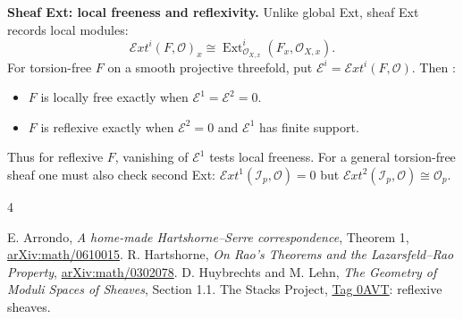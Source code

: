 \documentclass[11pt,a4paper]{article}
\begin{document}
\textbf{Sheaf Ext: local freeness and reflexivity.}
Unlike global Ext, sheaf Ext records
local modules:
$$
\mathcal{E}xt^i(F,\mathcal{O})_x
\cong\operatorname{Ext}^i_{\mathcal{O}_{X,x}}
(F_x,\mathcal{O}_{X,x}).
$$
For torsion-free $F$ on a smooth
projective threefold, put
$\mathcal{E}^i=\mathcal{E}xt^i(F,\mathcal{O})$.
Then \cite[Section 1.1]{hl}:
\begin{itemize}
\item $F$ is locally free exactly when
$\mathcal{E}^1=\mathcal{E}^2=0$.
\item $F$ is reflexive exactly when
$\mathcal{E}^2=0$ and $\mathcal{E}^1$
has finite support.
\end{itemize}
Thus for reflexive $F$, vanishing of
$\mathcal{E}^1$ tests local freeness.
For a general torsion-free sheaf one
must also check second Ext:
$\mathcal{E}xt^1(\mathcal{I}_p,\mathcal{O})=0$
but $\mathcal{E}xt^2(\mathcal{I}_p,\mathcal{O})
\cong\mathcal{O}_p$.

\begin{thebibliography}{4}
\small\raggedright
{} E. Arrondo,
\emph{A home-made Hartshorne--Serre
correspondence}, Theorem 1,
\href{https://arxiv.org/abs/math/0610015}
{arXiv:math/0610015}.
 R. Hartshorne,
\emph{On Rao's Theorems and the
Lazarsfeld--Rao Property},
\href{https://arxiv.org/abs/math/0302078}
{arXiv:math/0302078}.
 D. Huybrechts and M. Lehn,
\emph{The Geometry of Moduli Spaces
of Sheaves}, Section 1.1.
 The Stacks Project,
\href{https://stacks.math.columbia.edu/tag/0AVT}
{Tag 0AVT}: reflexive sheaves.
\end{thebibliography}
\end{document}

